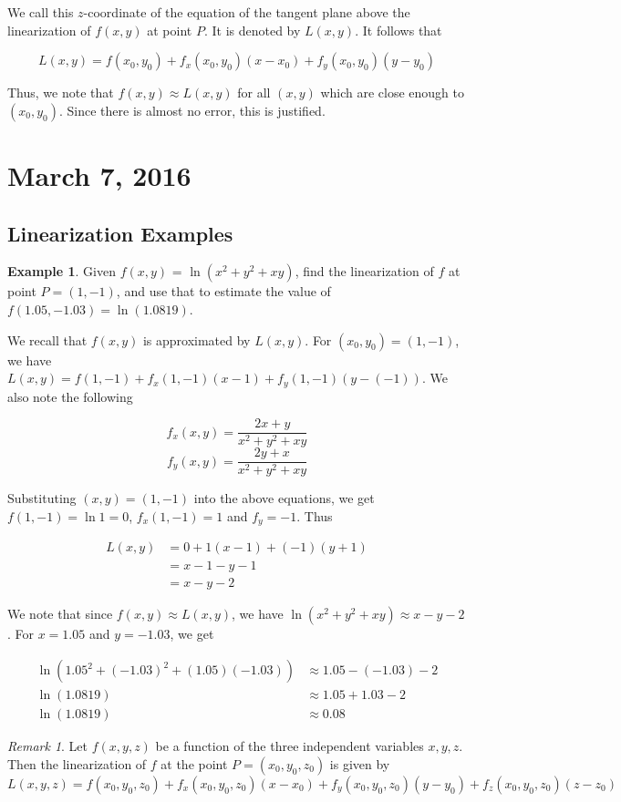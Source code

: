 \documentclass[11pt]{article}
\theoremstyle{plain} %
\theoremstyle{definition}
\theoremstyle{example}
\newtheorem*{example}{Example}
\theoremstyle{remark}
\newtheorem*{remark}{Remark}
\begin{document}
We call this $z$-coordinate of the equation of the tangent plane above the linearization of $f(x,y)$ at point $P$. It is denoted by $L(x,y)$. 
It follows that 

$$L(x,y)= f(x_0, y_0) + f_x(x_0, y_0)(x-x_0) + f_y(x_0, y_0)(y-y_0)$$

Thus, we note that $f(x,y) \approx L(x,y)$ for all $(x,y)$ which are close enough to $(x_0,y_0)$. Since there is almost no error, this is justified.

\section{March 7, 2016}
\subsection{Linearization Examples}

\begin{example}
Given $f(x,y)$ = $\ln \left(x^2+y^2+xy\right)$, find the linearization of $f$ at point $P=(1,-1)$, and use that to estimate the value of $f(1.05, -1.03) = \ln(1.0819)$.
\end{example}

We recall that $f(x,y)$ is approximated by $L(x,y)$. For $(x_0, y_0) = (1,-1)$, we have $L(x,y) = f(1,-1) + f_x(1,-1)(x-1) + f_y(1,-1)(y-(-1))$. We also note the following

$$f_x(x,y) = \frac{2x+y}{x^2+y^2+xy}$$
$$f_y(x,y) = \frac{2y+x}{x^2+y^2+xy}$$

Substituting $(x,y) = (1,-1)$ into the above equations, we get $f(1,-1) = \ln1 = 0$, $f_x(1,-1) = 1$ and $f_y = -1$. Thus

\begin{align*}
	L(x,y) &= 0 + 1(x-1) +(-1)(y+1)\\
	&= x-1-y-1\\
	&=x-y-2
\end{align*}

We note that since $f(x,y) \approx L(x,y)$, we have $\ln \left(x^2+y^2+xy \right) \approx x-y-2$. For $x=1.05$ and $y=-1.03$, we get

\begin{align*}
	\ln \left(1.05^2+(-1.03)^2+(1.05)(-1.03)\right) &\approx 1.05-(-1.03)-2\\
	\ln(1.0819) &\approx 1.05+1.03-2\\
	\ln (1.0819) &\approx 0.08
\end{align*}

\begin{remark}
Let $f(x, y, z)$ be a function of the three independent variables $x, y, z$. Then the linearization of $f$ at the point $P = (x_0,y_0,z_0)$ is given by $$L(x, y, z) = f(x_0, y_0, z_0) + f_x(x_0, y_0, z_0)(x-x_0) + f_y(x_0, y_0, z_0)(y-y_0)+f_z(x_0, y_0, z_0)(z-z_0)$$
\end{remark}
\end{document}

